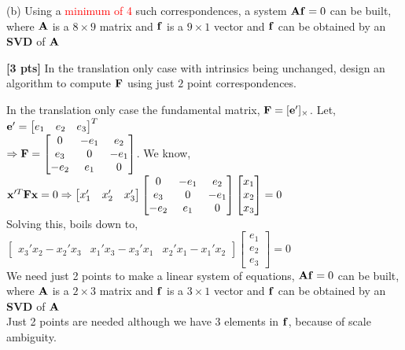 \documentclass[11pt,addpoints,answers]{exam}
\numberwithin{equation}{section} %
\numberwithin{figure}{section} %
\numberwithin{table}{section} %
\begin{document}
\begin{questions}
\begin{tcolorbox}[fit,height=6cm, width=\textwidth, blank, borderline={0.5pt}{-2pt},halign=left, valign=center, nobeforeafter]
(b) Using a \textcolor{red}{minimum of 4} such correspondences, a system $\mathbf{A} \mathbf{f} =0$ can be built, where $\mathbf{A}$ is a $8 \times 9$ matrix and $\mathbf{f}$ is a $9 \times 1$ vector and $\mathbf{f}$ can be obtained by an \textbf{SVD} of $\mathbf{A}$

\end{tcolorbox}

\question \textbf{[3 pts]} In the translation only case with intrinsics being unchanged, design an algorithm to compute $\mathbf{F}$ using just $2$ point correspondences.

\begin{tcolorbox}[fit,height=5cm, width=\textwidth, blank, borderline={0.5pt}{-2pt},halign=left, valign=center, nobeforeafter]
In the translation only case the fundamental matrix, $\mathbf{F} = [\mathbf{e}']_{\times}$. Let, $\mathbf{e}' = \begin{bmatrix} e_1 &e_2&e_3 \end{bmatrix}^T$\\
$\Rightarrow \mathbf{F} = \begin{bmatrix} 0 & -e_1 & e_2 \\ e_3 & 0 & -e_1 \\ -e_2 & e_1 & 0 \end{bmatrix}$. We know, $\mathbf{x}'^T \mathbf{F} \mathbf{x} =0\Rightarrow \begin{bmatrix} x_1'& x_2'& x_3' \end{bmatrix}\begin{bmatrix} 0 & -e_1 & e_2 \\ e_3 & 0 & -e_1 \\ -e_2 & e_1 & 0 \end{bmatrix}\begin{bmatrix} x_1\\ x_2\\ x_3 \end{bmatrix} =0 $\\
Solving this, boils down to, $\begin{bmatrix} x_3' x_2 - x_2' x_3& x_1' x_3 - x_3'x_1 & x_2' x_1 - x_1' x_2\end{bmatrix}\begin{bmatrix} e_1\\e_2\\e_3 \end{bmatrix} =0$\\
We need just 2 points to make a linear system of equations, $\mathbf{A} \mathbf{f} =0$ can be built, where $\mathbf{A}$ is a $2 \times 3$ matrix and $\mathbf{f}$ is a $3 \times 1$ vector and $\mathbf{f}$ can be obtained by an \textbf{SVD} of $\mathbf{A}$\\
Just 2 points are needed although we have 3 elements in $\mathbf{f}$, because of scale ambiguity.


\end{tcolorbox}
\end{questions}
\end{document}
